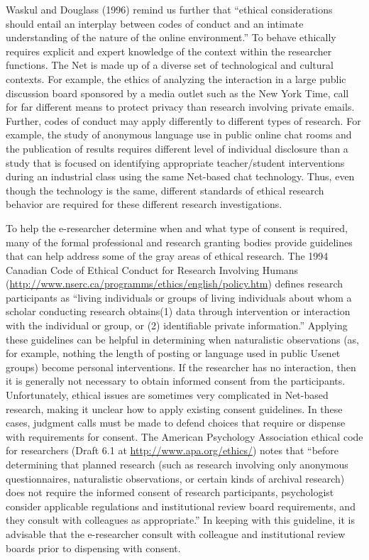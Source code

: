 \documentclass[]{article}
\begin{document}
Waskul and Douglass (1996) remind us further that ``ethical
considerations should entail an interplay between codes of conduct and
an intimate understanding of the nature of the online environment.'' To
behave ethically requires explicit and expert knowledge of the context
within the researcher functions. The Net is made up of a diverse set of
technological and cultural contexts. For example, the ethics of
analyzing the interaction in a large public discussion board sponsored
by a media outlet such as the New York Time, call for far different
means to protect privacy than research involving private emails.
Further, codes of conduct may apply differently to different types of
research. For example, the study of anonymous language use in public
online chat rooms and the publication of results requires different
level of individual disclosure than a study that is focused on
identifying appropriate teacher/student interventions during an
industrial class using the same Net-based chat technology. Thus, even
though the technology is the same, different standards of ethical
research behavior are required for these different research
investigations.

To help the e-researcher determine when and what type of consent is
required, many of the formal professional and research granting bodies
provide guidelines that can help address some of the gray areas of
ethical research. The 1994 Canadian Code of Ethical Conduct for Research
Involving Humans
(\url{http://www.nserc.ca/programms/ethics/english/policy.htm}) defines
research participants as ``living individuals or groups of living
individuals about whom a scholar conducting research obtains(1) data
through intervention or interaction with the individual or group, or (2)
identifiable private information.'' Applying these guidelines can be
helpful in determining when naturalistic observations (as, for example,
nothing the length of posting or language used in public Usenet groups)
become personal interventions. If the researcher has no interaction,
then it is generally not necessary to obtain informed consent from the
participants. Unfortunately, ethical issues are sometimes very
complicated in Net-based research, making it unclear how to apply
existing consent guidelines. In these cases, judgment calls must be made
to defend choices that require or dispense with requirements for
consent. The American Psychology Association ethical code for
researchers (Draft 6.1 at \url{http://www.apa.org/ethics/}) notes that
``before determining that planned research (such as research involving
only anonymous questionnaires, naturalistic observations, or certain
kinds of archival research) does not require the informed consent of
research participants, psychologist consider applicable regulations and
institutional review board requirements, and they consult with
colleagues as appropriate.'' In keeping with this guideline, it is
advisable that the e-researcher consult with colleague and institutional
review boards prior to dispensing with consent.
\end{document}
